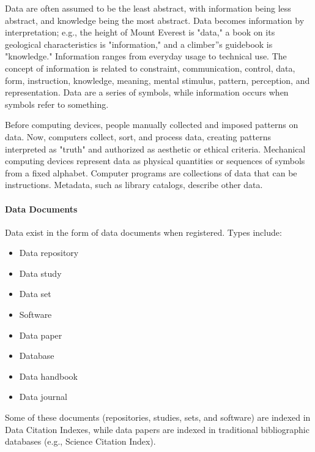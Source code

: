 Data are often assumed to be the least abstract, with information being less abstract, and knowledge being the most abstract. Data becomes information by interpretation; e.g., the height of Mount Everest is "data," a book on its geological characteristics is "information," and a climber''s guidebook is "knowledge." Information ranges from everyday usage to technical use. The concept of information is related to constraint, communication, control, data, form, instruction, knowledge, meaning, mental stimulus, pattern, perception, and representation. Data are a series of symbols, while information occurs when symbols refer to something.



Before computing devices, people manually collected and imposed patterns on data. Now, computers collect, sort, and process data, creating patterns interpreted as "truth" and authorized as aesthetic or ethical criteria. Mechanical computing devices represent data as physical quantities or sequences of symbols from a fixed alphabet. Computer programs are collections of data that can be instructions. Metadata, such as library catalogs, describe other data.



\paragraph{Data Documents}



Data exist in the form of data documents when registered. Types include:



\begin{itemize}
    \item Data repository
    \item Data study
    \item Data set
    \item Software
    \item Data paper
    \item Database
    \item Data handbook
    \item Data journal
\end{itemize}

Some of these documents (repositories, studies, sets, and software) are indexed in Data Citation Indexes, while data papers are indexed in traditional bibliographic databases (e.g., Science Citation Index).



